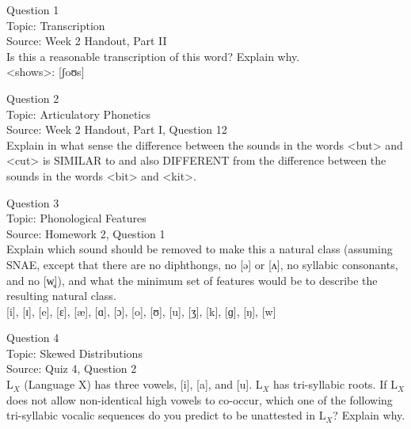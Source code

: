 \documentclass[12pt]{article}
\begin{document}
{\large Question 1}\\

Topic: Transcription\\
Source: Week 2 Handout, Part II\\

Is this a reasonable transcription of this word? Explain why.\\

<shows>: {[ʃoʊs]}


\newpage

{\large Question 2}\\

Topic: Articulatory Phonetics\\
Source: Week 2 Handout, Part I, Question 12\\

Explain in what sense the difference between the sounds in the words <but> and <cut> is SIMILAR to and also DIFFERENT from the difference between the sounds in the words <bit> and <kit>.\\


\newpage

{\large Question 3}\\

Topic: Phonological Features\\
Source: Homework 2, Question 1\\

Explain which sound should be removed to make this a natural class (assuming SNAE, except that there are no diphthongs, no [ə] or [ʌ], no syllabic consonants, and no [w̥]), and what the minimum set of features would be to describe the resulting natural class.\\

{[i]}, {[ɪ]}, {[e]}, {[ɛ]}, {[æ]}, {[ɑ]}, {[ɔ]}, {[o]}, {[ʊ]}, {[u]}, {[ʒ]}, {[k]}, {[ɡ]}, {[ŋ]}, {[w]}


\newpage

{\large Question 4}\\

Topic: Skewed Distributions\\
Source: Quiz 4, Question 2\\

L$_X$ (Language X) has three vowels, [i], [a], and [u]. L$_X$ has tri-syllabic roots. If L$_X$ does not allow non-identical high vowels to co-occur, which one of the following tri-syllabic vocalic sequences do you predict to be unattested in L$_X$? Explain why.\\
\end{document}
